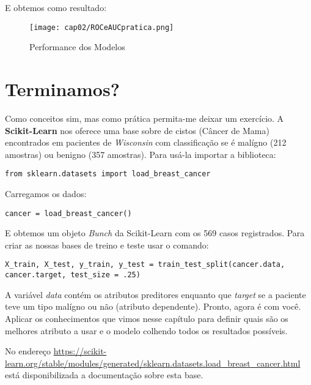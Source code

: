 E obtemos como resultado:
\begin{figure}[H]
	\centering
	\texttt{[image: cap02/ROCeAUCpratica.png]}
	\caption{Performance dos Modelos}
\end{figure}

\section{Terminamos?}
Como conceitos sim, mas como prática permita-me deixar um exercício. A \textbf{Scikit-Learn} nos oferece uma base sobre de cistos (Câncer de Mama) encontrados em pacientes de \textit{Wisconsin} com classificação se é malígno (212 amostras) ou benigno (357 amostras). Para usá-la importar a biblioteca:
\begin{lstlisting}[]
from sklearn.datasets import load_breast_cancer
\end{lstlisting}

Carregamos os dados:
\begin{lstlisting}[]
cancer = load_breast_cancer()
\end{lstlisting}

E obtemos um objeto \textit{Bunch} da Scikit-Learn com os 569 casos registrados. Para criar as nossas bases de treino e teste usar o comando:
\begin{lstlisting}[]
X_train, X_test, y_train, y_test = train_test_split(cancer.data, cancer.target, test_size = .25)
\end{lstlisting}

A variável \textit{data} contém os atributos preditores enquanto que \textit{target} se a paciente teve um tipo malígno ou não (atributo dependente). Pronto, agora é com você. Aplicar os conhecimentos que vimos nesse capítulo para definir quais são os melhores atributo a usar e o modelo colhendo todos os resultados possíveis.

No endereço \url{https://scikit-learn.org/stable/modules/generated/sklearn.datasets.load_breast_cancer.html} está disponibilizada a documentação sobre esta base.

\clearpage
